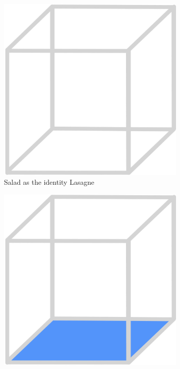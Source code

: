 \documentclass{beamer}
\begin{document}
\begin{frame}
    \begin{figure}
        \begin{subfigure}{.24\textwidth}
          \centering
          \includegraphics[width=\linewidth]{images/cube_rule_of_food/salad/29_salad.jpg}
          \caption{\label{fig:salad-lasagne}Salad as the identity Lasagne}
        \end{subfigure}
        \begin{subfigure}{.24\textwidth}
          \centering
          \includegraphics[width=\linewidth]{images/cube_rule_of_food/toast/16_toast.jpg}

\end{subfigure}
\end{figure}
\end{frame}
\end{document}
